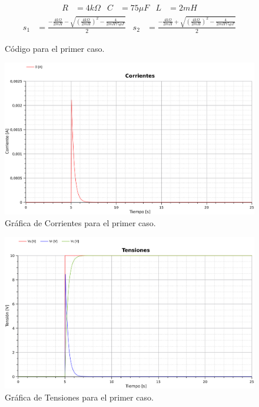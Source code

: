 

\begin{align*}
  R&=4k\Omega&
  C&=75\mu F&
  L&=2mH
\end{align*}
\begin{align*}
  s_1 &= \frac{-\frac{4k\Omega}{2mH}
  - \sqrt{\left(\frac{4k\Omega}{2mH}\right)^2-\frac{4}{2mH75\mu F}}}{2}
  &
  s_2 &= \frac{-\frac{4k\Omega}{2mH}
  + \sqrt{\left(\frac{4k\Omega}{2mH}\right)^2-\frac{4}{2mH75\mu F}}}{2}
\end{align*}


\begin{figure}[H]
  
  \caption{Código para el primer caso.}
\end{figure}

\begin{figure}[H]
  \centering
  \label{gr:caso1:corrientes}
  \includegraphics[width=\textwidth]{modelica/graficas/1-corrientes}
  \caption{Gráfica de Corrientes para el primer caso.}
\end{figure}

\begin{figure}[H]
  \centering
  \label{gr:caso1:tensiones}
  \includegraphics[width=\textwidth]{modelica/graficas/1-tensiones}
  \caption{Gráfica de Tensiones para el primer caso.}
\end{figure}
